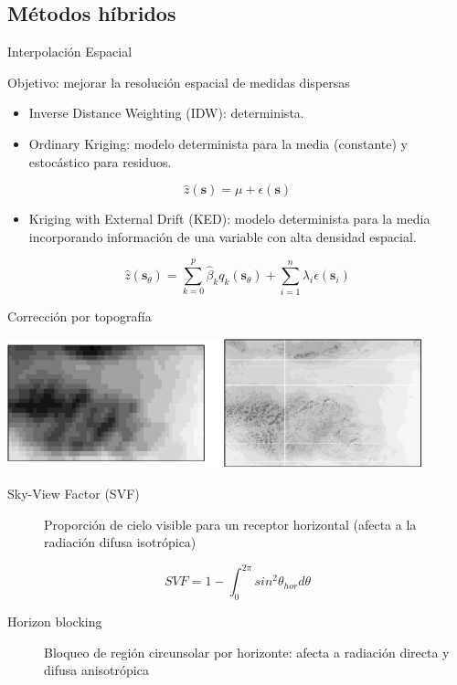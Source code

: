 \documentclass[xcolor={usenames,svgnames,dvipsnames}]{beamer}
\begin{document}
\subsection{Métodos híbridos}
\label{sec-6-7}

\begin{frame}[label=sec-6-7-1]{Interpolación Espacial}
\begin{block}{\alert{Objetivo}: mejorar la resolución espacial de medidas dispersas}
\begin{itemize}
\item \alert{Inverse Distance Weighting (IDW)}: determinista.

\item \alert{Ordinary Kriging}: modelo determinista para la media (constante) y estocástico para residuos.
\end{itemize}

\[
  \hat{z}(\mathbf{s}) = \mu + \epsilon(\mathbf{s})
\]

\begin{itemize}
\item \alert{Kriging with External Drift (KED)}: modelo determinista para la media incorporando información de una variable con alta densidad espacial.
\end{itemize}
\[  \hat{z}(\mathbf{s}_\theta) =  \sum_{k=0}^p \hat{\beta}_k q_k(\mathbf{s}_\theta) + 
  \sum_{i=1}^n \lambda_i \epsilon(\mathbf{s}_i)
\]

\nocite{Journee.Bertrand2010}
\nocite{Antonanzas-Torres.Canizares.ea2013}
\nocite{Bojanowski.Vrieling.ea2013}
\end{block}
\end{frame}


\begin{frame}[label=sec-6-7-2]{Corrección por topografía}
\begin{center}
\includegraphics[width=0.9\textwidth]{../figs/downscaling.pdf}
\end{center}

\begin{description}
\item[{Sky-View Factor (SVF)}] Proporción de cielo visible para un receptor horizontal (afecta a la radiación difusa isotrópica)
\end{description}
\[
SVF=1-\int_0^{2\pi}sin^{2} \theta_{hor} d\theta
\]

\begin{description}
\item[{Horizon blocking}] Bloqueo de región circunsolar por horizonte: afecta a radiación directa y difusa anisotrópica
\end{description}


\nocite{Bosch.Batlles.ea2010}
\nocite{Tovar-Pescador.Pozo-Vazquez.ea2006}
\nocite{Antonanzas-Torres.MartinezdePison.ea2013}
\nocite{Hofierka.Suri2002}
\end{frame}
\end{document}
